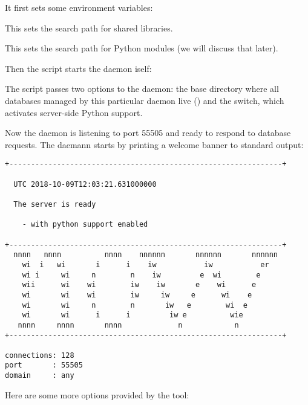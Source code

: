 It first sets some environment variables:


This sets the search path for shared libraries.


This sets the search path for Python modules
(we will discuss that later).

Then the script starts the daemon iself:


The script passes two options to the daemon:
the base directory where all databases
managed by this particular daemon live ()
and the  switch, which activates
server-side Python support.

Now the daemon is listening to port 55505
and ready to respond to database requests.
The daemann starts by printing a welcome banner
to standard output:

\begingroup
\small
\begin{verbatim}
+---------------------------------------------------------------+ 
 
  UTC 2018-10-09T12:03:21.631000000
 
  The server is ready
 
    - with python support enabled
 
+---------------------------------------------------------------+ 
  nnnn   nnnn          nnnn    nnnnnn       nnnnnn       nnnnnn  
    wi  i   wi       i      i    iw           iw           er   
    wi i     wi     n        n    iw         e  wi        e    
    wii      wi    wi        iw    iw       e    wi      e        
    wi       wi    wi        iw     iw     e      wi    e        
    wi       wi     n        n       iw   e        wi  e        
    wi       wi      i      i         iw e          wie          
   nnnn     nnnn       nnnn             n            n            
+---------------------------------------------------------------+ 

connections: 128
port       : 55505
domain     : any
\end{verbatim}
\endgroup

Here are some more options provided by
the  tool:

